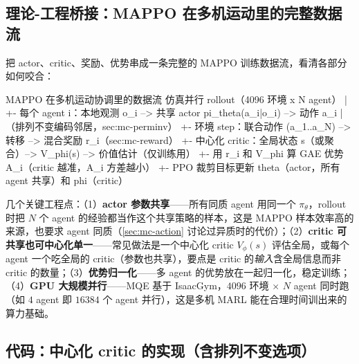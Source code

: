 \subsection{理论-工程桥接：MAPPO 在多机运动里的完整数据流}
\label{sec:mc-mappo-flow}

把 actor、critic、奖励、优势串成一条完整的 MAPPO 训练数据流，看清各部分如何咬合：

\begin{codebox}[text]{MAPPO 在多机运动协调里的数据流}
仿真并行 rollout（4096 环境 x N agent）
   |
   +- 每个 agent i：本地观测 o_i --> 共享 actor pi_theta(a_i|o_i) --> 动作 a_i
   |                                  （排列不变编码邻居，sec:mc-perminv）
   +- 环境 step：联合动作 (a_1..a_N) --> 转移 --> 混合奖励 r_i（sec:mc-reward）
   +- 中心化 critic：全局状态 s（或聚合）--> V_phi(s) --> 价值估计（仅训练用）
   +- 用 r_i 和 V_phi 算 GAE 优势 A_i（critic 越准，A_i 方差越小）
   +- PPO 裁剪目标更新 theta（actor，所有 agent 共享）和 phi（critic）
\end{codebox}

\noindent 几个关键工程点：（1）\textbf{actor 参数共享}——所有同质 agent 用同一个 $\pi_\theta$，rollout 时把 $N$ 个 agent 的经验都当作这个共享策略的样本，这是 MAPPO 样本效率高的来源，也要求 agent 同质（\cref{sec:mc-action} 讨论过异质时的代价）；（2）\textbf{critic 可共享也可中心化单一}——常见做法是一个中心化 critic $V_\phi(s)$ 评估全局，或每个 agent 一个吃全局的 critic（参数也共享），要点是 critic 的\emph{输入}含全局信息而非 critic 的数量；（3）\textbf{优势归一化}——多 agent 的优势放在一起归一化，稳定训练；（4）\textbf{GPU 大规模并行}——MQE 基于 IsaacGym\cite{xiong2024mqe}，$4096$ 环境 $\times$ $N$ agent 同时跑（如 $4$ agent 即 $16384$ 个 agent 并行），这是多机 MARL 能在合理时间训出来的算力基础。

\subsection{代码：中心化 critic 的实现（含排列不变选项）}
\label{sec:mc-ctde-code}

